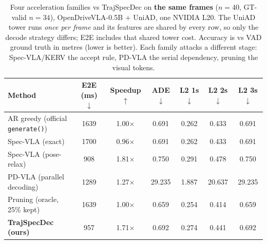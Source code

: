 \begin{table}[t]
\centering
\caption{Four acceleration families vs TrajSpecDec on \textbf{the same frames} ($n{=}40$, GT-valid $n{=}34$), OpenDriveVLA-0.5B + UniAD, one NVIDIA L20. The UniAD tower runs \emph{once per frame} and its features are shared by every row, so only the decode strategy differs; E2E includes that shared tower cost. Accuracy is vs VAD ground truth in metres (lower is better). Each family attacks a different stage: Spec-VLA/KERV the accept rule, PD-VLA the serial dependency, pruning the visual tokens.}
\label{tab:unified-accel}
\small
\setlength{\tabcolsep}{4.5pt}
\begin{tabular}{lcccccc}
\toprule
Method & E2E (ms) $\downarrow$ & Speedup $\uparrow$ & ADE $\downarrow$ & L2 1s $\downarrow$ & L2 2s $\downarrow$ & L2 3s $\downarrow$ \\
\midrule
AR greedy (official \texttt{generate()}) & 1639 & 1.00$\times$ & 0.691 & 0.262 & 0.433 & 0.691 \\
Spec-VLA (exact) & 1700 & 0.96$\times$ & 0.691 & 0.262 & 0.433 & 0.691 \\
Spec-VLA (pose-relax) & 908 & 1.81$\times$ & 0.750 & 0.291 & 0.478 & 0.750 \\
PD-VLA (parallel decoding) & 1289 & 1.27$\times$ & 29.235 & 1.887 & 20.637 & 29.235 \\
Pruning (oracle, 25\% kept) & 1639 & 1.00$\times$ & 0.659 & 0.254 & 0.414 & 0.659 \\
\textbf{TrajSpecDec (ours)} & 957 & 1.71$\times$ & 0.692 & 0.274 & 0.441 & 0.692 \\
\bottomrule
\end{tabular}
\end{table}
